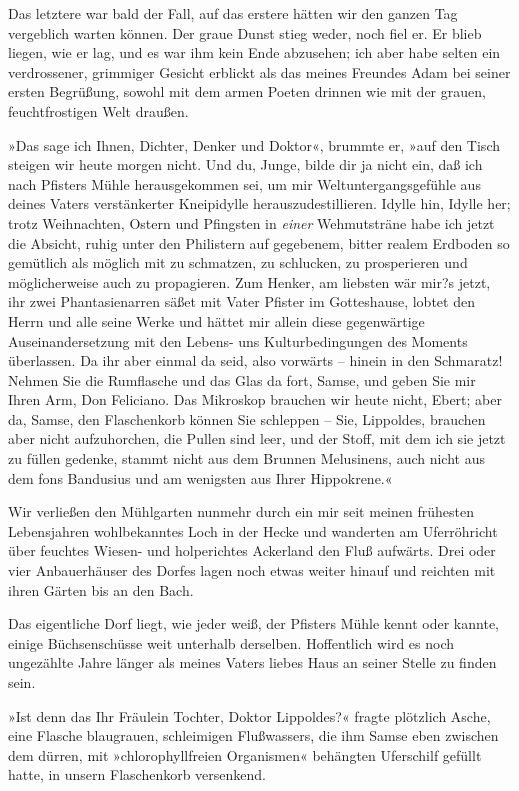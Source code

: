Das letztere war bald der Fall, auf das erstere hätten wir den
ganzen Tag vergeblich warten können. Der graue Dunst stieg weder,
noch fiel er. Er blieb liegen, wie er lag, und es war ihm kein Ende
abzusehen; ich aber habe selten ein verdrossener, grimmiger Gesicht
erblickt als das meines Freundes Adam bei seiner ersten Begrüßung,
sowohl mit dem armen Poeten drinnen wie mit der grauen,
feuchtfrostigen Welt draußen.

»Das sage ich Ihnen, Dichter, Denker und Doktor«, brummte er, »auf
den Tisch steigen wir heute morgen nicht. Und du, Junge, bilde dir
ja nicht ein, daß ich nach Pfisters Mühle herausgekommen sei, um
mir Weltuntergangsgefühle aus deines Vaters verstänkerter
Kneipidylle herauszudestillieren. Idylle hin, Idylle her; trotz
Weihnachten, Ostern und Pfingsten in \emph{einer} Wehmutsträne habe
ich jetzt die Absicht, ruhig unter den Philistern auf gegebenem,
bitter realem Erdboden so gemütlich als möglich mit zu schmatzen,
zu schlucken, zu prosperieren und möglicherweise auch zu
propagieren. Zum Henker, am liebsten wär mir?s jetzt, ihr zwei
Phantasienarren säßet mit Vater Pfister im Gotteshause, lobtet den
Herrn und alle seine Werke und hättet mir allein diese gegenwärtige
Auseinandersetzung mit den Lebens- uns Kulturbedingungen des
Moments überlassen. Da ihr aber einmal da seid, also vorwärts –
hinein in den Schmaratz! Nehmen Sie die Rumflasche und das Glas da
fort, Samse, und geben Sie mir Ihren Arm, Don Feliciano. Das
Mikroskop brauchen wir heute nicht, Ebert; aber da, Samse, den
Flaschenkorb können Sie schleppen – Sie, Lippoldes, brauchen aber
nicht aufzuhorchen, die Pullen sind leer, und der Stoff, mit dem
ich sie jetzt zu füllen gedenke, stammt nicht aus dem Brunnen
Melusinens, auch nicht aus dem fons Bandusius und am wenigsten aus
Ihrer Hippokrene.«

Wir verließen den Mühlgarten nunmehr durch ein mir seit meinen
frühesten Lebensjahren wohlbekanntes Loch in der Hecke und
wanderten am Uferröhricht über feuchtes Wiesen- und holperichtes
Ackerland den Fluß aufwärts. Drei oder vier Anbauerhäuser des
Dorfes lagen noch etwas weiter hinauf und reichten mit ihren Gärten
bis an den Bach.

Das eigentliche Dorf liegt, wie jeder weiß, der Pfisters Mühle
kennt oder kannte, einige Büchsenschüsse weit unterhalb derselben.
Hoffentlich wird es noch ungezählte Jahre länger als meines Vaters
liebes Haus an seiner Stelle zu finden sein.

»Ist denn das Ihr Fräulein Tochter, Doktor Lippoldes?« fragte
plötzlich Asche, eine Flasche blaugrauen, schleimigen Flußwassers,
die ihm Samse eben zwischen dem dürren, mit »chlorophyllfreien
Organismen« behängten Uferschilf gefüllt hatte, in unsern
Flaschenkorb versenkend.

